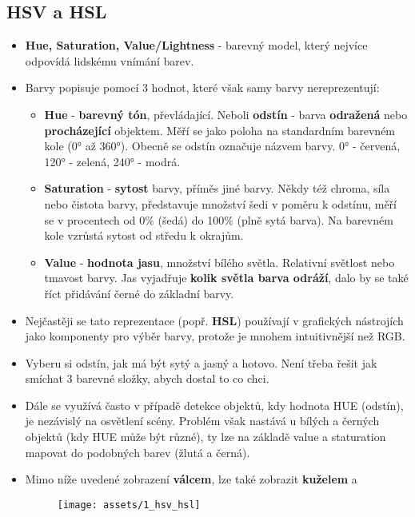 \subsection{HSV a HSL}
\begin{itemize}
    \item \textbf{Hue, Saturation, Value/Lightness} - barevný model, který nejvíce odpovídá lidskému vnímání barev.
    \item Barvy popisuje pomocí 3 hodnot, které však samy barvy nereprezentují:
          \begin{itemize}
              \item \textbf{Hue} - \textbf{barevný tón}, převládající. Neboli \textbf{odstín} - barva \textbf{odražená} nebo \textbf{procházející} objektem. Měří se jako poloha na standardním barevném kole (\ang{0} až \ang{360}). Obecně se odstín označuje názvem barvy. \ang{0} - červená, \ang{120} - zelená, \ang{240} - modrá.
              \item \textbf{Saturation} - \textbf{sytost} barvy, příměs jiné barvy. Někdy též chroma, síla nebo čistota barvy, představuje množství šedi v poměru k odstínu, měří se v procentech od 0\% (šedá) do 100\% (plně sytá barva). Na barevném kole vzrůstá sytost od středu k okrajům.
              \item \textbf{Value} - \textbf{hodnota jasu}, množství bílého světla. Relativní světlost nebo tmavost barvy. Jas vyjadřuje \textbf{kolik světla barva odráží}, dalo by se také říct přidávání černé do základní barvy.
          \end{itemize}
    \item Nejčastěji se tato reprezentace (popř. \textbf{HSL}) používají v grafických nástrojích jako komponenty pro výběr barvy, protože je mnohem intuitivnější než RGB.
    \item Vyberu si odstín, jak má být sytý a jasný a hotovo. Není třeba řešit jak smíchat 3 barevné složky, abych dostal to co chci.
    \item Dále se využívá často v případě detekce objektů, kdy hodnota HUE (odstín), je nezávislý na osvětlení scény. Problém však nastává u bílých a černých objektů (kdy HUE může být různé), ty lze na základě value a staturation mapovat do podobných barev (žlutá a černá).
    \item Mimo níže uvedené zobrazení \textbf{válcem}, lze také zobrazit \textbf{kuželem} a
          \begin{figure}[H]
              \centering
              \texttt{[image: assets/1\_hsv\_hsl]}
          \end{figure}
\end{itemize}

